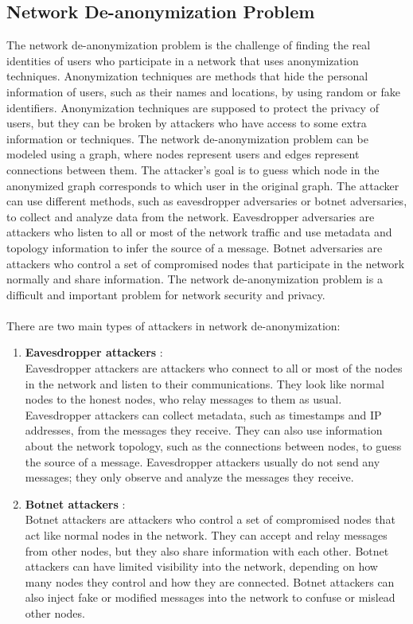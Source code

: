 \subsection{Network De-anonymization Problem}
The network de-anonymization problem is the challenge of finding the real identities of users who participate in a network that uses anonymization techniques. Anonymization techniques are methods that hide the personal information of users, such as their names and locations, by using random or fake identifiers. Anonymization techniques are supposed to protect the privacy of users, but they can be broken by attackers who have access to some extra information or techniques. The network de-anonymization problem can be modeled using a graph, where nodes represent users and edges represent connections between them. The attacker’s goal is to guess which node in the anonymized graph corresponds to which user in the original graph. The attacker can use different methods, such as eavesdropper adversaries or botnet adversaries, to collect and analyze data from the network. Eavesdropper adversaries are attackers who listen to all or most of the network traffic and use metadata and topology information to infer the source of a message. Botnet adversaries are attackers who control a set of compromised nodes that participate in the network normally and share information. The network de-anonymization problem is a difficult and important problem for network security and privacy.\\\\
There are two main types of attackers in network de-anonymization:
\begin{enumerate}
	\item \textbf{Eavesdropper attackers} :\\ Eavesdropper attackers are attackers who connect to all or most of the nodes in the network and listen to their communications. They look like normal nodes to the honest nodes, who relay messages to them as usual. Eavesdropper attackers can collect metadata, such as timestamps and IP addresses, from the messages they receive. They can also use information about the network topology, such as the connections between nodes, to guess the source of a message. Eavesdropper attackers usually do not send any messages; they only observe and analyze the messages they receive.
	\item \textbf{Botnet attackers} : \\
	Botnet attackers are attackers who control a set of compromised nodes that act like normal nodes in the network. They can accept and relay messages from other nodes, but they also share information with each other. Botnet attackers can have limited visibility into the network, depending on how many nodes they control and how they are connected. Botnet attackers can also inject fake or modified messages into the network to confuse or mislead other nodes.
\end{enumerate}
